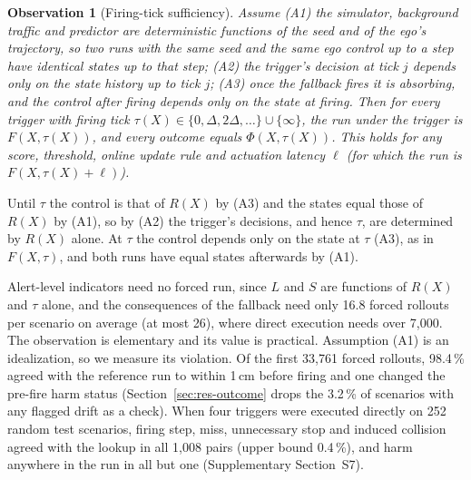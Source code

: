 \documentclass[lettersize,journal]{IEEEtran}
\newtheorem{observation}{Observation}
\begin{document}
\begin{observation}[Firing-tick sufficiency]
\label{prop:exact}
Assume (A1) the simulator, background traffic and predictor are
deterministic functions of the seed and of the ego's trajectory, so two
runs with the same seed and the same ego control up to a step have
identical states up to that step; (A2) the trigger's decision at tick $j$
depends only on the state history up to tick $j$; (A3) once the fallback
fires it is absorbing, and the control after firing depends only on the
state at firing. Then for every trigger with firing tick
$\tau(X)\in\{0,\Delta,2\Delta,\dots\}\cup\{\infty\}$, the run under the trigger is
$F(X,\tau(X))$, and every outcome equals $\Phi(X,\tau(X))$. This holds
for any score, threshold, online update rule and actuation latency
$\ell$ (for which the run is $F(X,\tau(X)+\ell)$).
\end{observation}
\begin{IEEEproof}
Until $\tau$ the control is that of $R(X)$ by (A3) and the states equal
those of $R(X)$ by (A1), so by (A2) the trigger's decisions, and hence
$\tau$, are determined by $R(X)$ alone. At $\tau$ the control depends
only on the state at $\tau$ (A3), as in $F(X,\tau)$, and both runs have
equal states afterwards by (A1).
\end{IEEEproof}
Alert-level indicators need no forced run, since $L$ and $S$ are functions
of $R(X)$ and $\tau$ alone, and the consequences of the fallback need only 16.8
forced rollouts per scenario on average (at most 26), where direct execution
needs over 7{,}000. The observation is elementary and its value is practical.
Assumption (A1) is an idealization, so we measure its violation. Of the first 33{,}761 forced rollouts, 98.4\,\% agreed
with the reference run to within 1\,cm before firing and one changed the
pre-fire harm status (Section~\ref{sec:res-outcome} drops the 3.2\,\% of
scenarios with any flagged drift as a check). When four triggers were executed directly
on 252 random test scenarios, firing step, miss, unnecessary stop and induced
collision agreed with the lookup in all 1{,}008 pairs (upper bound 0.4\,\%),
and harm anywhere in the run in all but one (Supplementary Section~S7).
\end{document}
